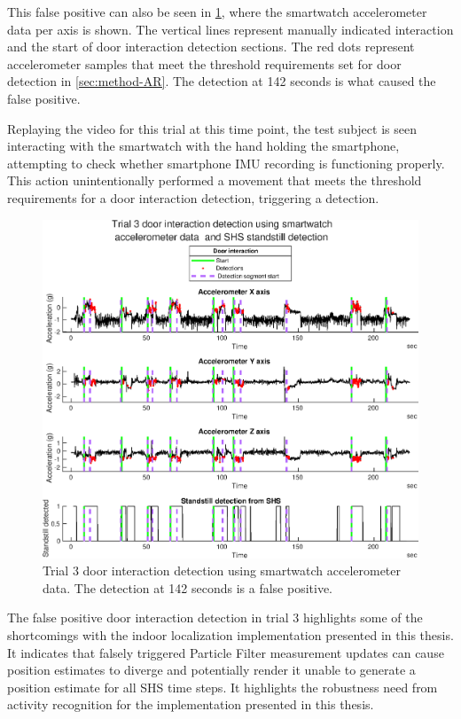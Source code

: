 This false positive can also be seen in \cref{fig:trial_3_door_interaction_detection_using_smartwatch1}, where the smartwatch accelerometer data per axis is shown. The vertical lines represent manually indicated interaction and the start of door interaction detection sections. The red dots represent accelerometer samples that meet the threshold requirements set for door detection in \cref{sec:method-AR}. The detection at 142 seconds is what caused the false positive.\par 

Replaying the video for this trial at this time point, the test subject is seen interacting with the smartwatch with the hand holding the smartphone, attempting to check whether smartphone IMU recording is functioning properly. This action unintentionally performed a movement that meets the threshold requirements for a door interaction detection, triggering a detection. \par 

\begin{figure}[H]
	\centering
	\includegraphics[width=0.9\linewidth]{images/20201201_1505_Trial_3_door_interaction_detection_using_smartwatch_1}
	\setlength{\belowcaptionskip}{-10pt}
	\caption{Trial 3 door interaction detection using smartwatch accelerometer data. The detection at 142 seconds is a false positive.}
	\label{fig:trial_3_door_interaction_detection_using_smartwatch1}
\end{figure}

The false positive door interaction detection in trial 3 highlights some of the shortcomings with the indoor localization implementation presented in this thesis. It indicates that falsely triggered Particle Filter measurement updates can cause position estimates to diverge and potentially render it unable to generate a position estimate for all SHS time steps. It highlights the robustness need from activity recognition for the implementation presented in this thesis.

